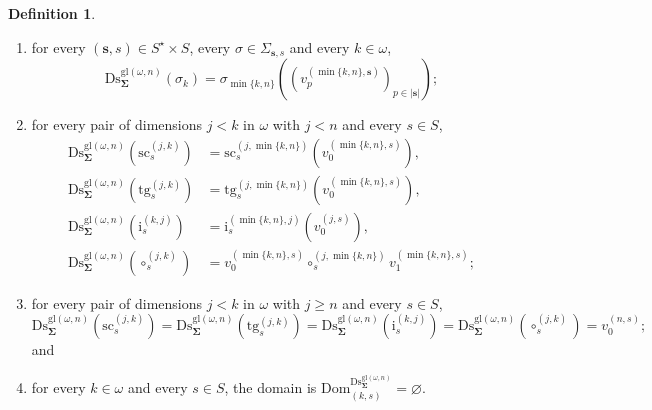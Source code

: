 \documentclass[a4paper, reqno
]{amsart}
\newcommand{\bb}[1]{\ensuremath{\lvert #1 \rvert}}
\newcommand{\sig}[1]{\mathbf{#1}}             %
\newcommand{\Dom}{\mathrm{Dom}}
\newcommand{\gl}{\mathrm{gl}}                %
\newcommand{\src}{\mathrm{sc}}
\newcommand{\tgt}{\mathrm{tg}}
\newcommand{\Ds}{\mathrm{Ds}}
\theoremstyle{plain}
\theoremstyle{definition}
\newtheorem{definition}[theorem]{Definition}
\begin{document}
\begin{definition}
\begin{enumerate}
\begin{enumerate}
$$
\varphi^{\Ds^{\gl(\omega,n)}_{\sig{\Sigma}}}(k,s)=(\min\{k,n\},s);
$$
\item for every $(\mathbf{s},s)\in S^{\star}\times S$, every $\sigma\in\Sigma_{\mathbf{s},s}$ and every $k\in\omega$,
$$
\Ds^{\gl(\omega,n)}_{\sig{\Sigma}}(\sigma_{k})=\sigma_{\min\{k,n\}}\left(\left(v^{(\min\{k,n\},\mathbf{s})}_{p}\right)_{p\in\bb{\mathbf{s}}}\right);
$$
\item for every pair of dimensions $j<k$ in $\omega$ with $j<n$ and every $s\in S$,
\begin{align*}
\Ds^{\gl(\omega,n)}_{\sig{\Sigma}}(\src^{(j,k)}_{s})&=\src^{(j,\min\{k,n\})}_{s}\left(v^{(\min\{k,n\},s)}_{0}\right),\\
\Ds^{\gl(\omega,n)}_{\sig{\Sigma}}(\tgt^{(j,k)}_{s})&=\tgt^{(j,\min\{k,n\})}_{s}\left(v^{(\min\{k,n\},s)}_{0}\right),\\
\Ds^{\gl(\omega,n)}_{\sig{\Sigma}}(\mathrm{i}^{(k,j)}_{s})&=\mathrm{i}^{(\min\{k,n\},j)}_{s}\left(v^{(j,s)}_{0}\right),\\
\Ds^{\gl(\omega,n)}_{\sig{\Sigma}}(\circ^{(j,k)}_{s})&=v^{(\min\{k,n\},s)}_{0}\circ^{(j,\min\{k,n\})}_{s}v^{(\min\{k,n\},s)}_{1};
\end{align*}
\item for every pair of dimensions $j<k$ in $\omega$ with $j\geq n$ and every $s\in S$,
$$
\Ds^{\gl(\omega,n)}_{\sig{\Sigma}}(\src^{(j,k)}_{s})=
\Ds^{\gl(\omega,n)}_{\sig{\Sigma}}(\tgt^{(j,k)}_{s})=
\Ds^{\gl(\omega,n)}_{\sig{\Sigma}}(\mathrm{i}^{(k,j)}_{s})=
\Ds^{\gl(\omega,n)}_{\sig{\Sigma}}(\circ^{(j,k)}_{s})=v^{(n,s)}_{0};
$$
and
\item for every $k\in\omega$ and every $s\in S$, the domain is $\Dom^{\Ds^{\gl(\omega,n)}_{\sig{\Sigma}}}_{(k,s)}=\varnothing$.
\end{enumerate}
\end{enumerate}
\end{definition}
\end{document}
